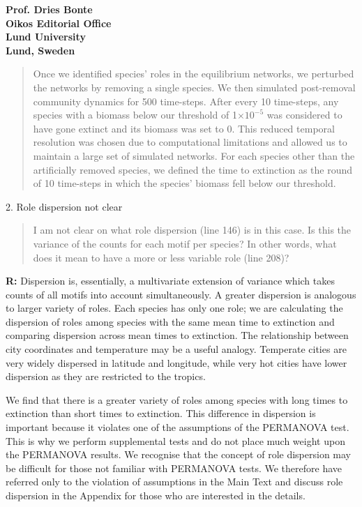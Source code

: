 \documentclass[12pt]{letter}
\begin{document}
\begin{letter}{\bf Prof. Dries Bonte\\
Oikos Editorial Office \\
Lund University \\
Lund, Sweden}
    \begin{quotation}

            Once we identified species' roles in the equilibrium networks, we perturbed the networks by removing a single species. 
            We then simulated post-removal community dynamics for 500 time-steps.
            After every 10 time-steps, any species with a biomass below our threshold of 1$\times10^{-5}$ was considered to have gone extinct and its biomass was set to 0.
            This reduced temporal resolution was chosen due to computational limitations and allowed us to maintain a large set of simulated networks.
            For each species other than the artificially removed species, we defined the time to extinction as the round of 10 time-steps in which the species' biomass fell below our threshold. 

    \end{quotation}


    2. Role dispersion not clear

        \begin{quotation}
        I am not clear on what role dispersion (line 146) is in this case. Is this the variance of the counts for each motif per species? In other words, what does it mean to have a more or less variable role (line 208)?
        \end{quotation}
        
        \textbf{R:} Dispersion is, essentially, a multivariate extension of variance which takes counts of all motifs into account simultaneously.
        A greater dispersion is analogous to larger variety of roles.
        Each species has only one role; we are calculating the dispersion of roles among species with the same mean time to extinction and comparing dispersion across mean times to extinction. 
        The relationship between city coordinates and temperature may be a useful analogy. 
        Temperate cities are very widely dispersed in latitude and longitude, while very hot cities have lower dispersion as they are restricted to the tropics.
        
        
        We find that there is a greater variety of roles among species with long times to extinction than short times to extinction.        
        This difference in dispersion is important because it violates one of the assumptions of the PERMANOVA test.
        This is why we perform supplemental tests and do not place much weight upon the PERMANOVA results.
        We recognise that the concept of role dispersion may be difficult for those not familiar with PERMANOVA tests.
        We therefore have referred only to the violation of assumptions in the Main Text and discuss role dispersion in the Appendix for those who are interested in the details.



\end{letter}
\end{document}
